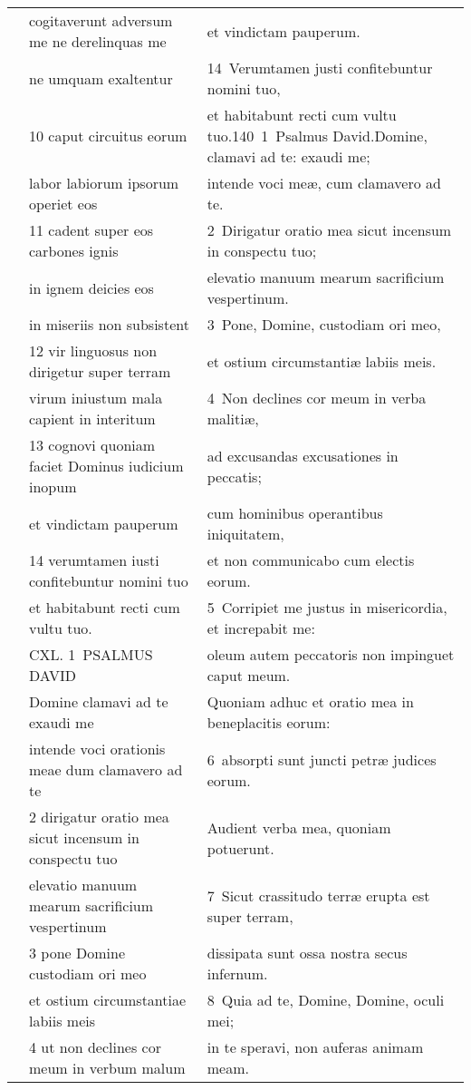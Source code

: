 \documentclass{article}
\begin{document}
\begin{longtable}{@{}p{}p{}p{}@{}}
	&	cogitaverunt adversum me ne derelinquas me	&	et vindictam pauperum.	\\
	&	ne umquam exaltentur	&	14 Verumtamen justi confitebuntur nomini tuo,	\\
	&	10 caput circuitus eorum	&	et habitabunt recti cum vultu tuo.140 1 Psalmus David.Domine, clamavi ad te: exaudi me;	\\
	&	labor labiorum ipsorum operiet eos	&	intende voci meæ, cum clamavero ad te.	\\
	&	11 cadent super eos carbones ignis	&	2 Dirigatur oratio mea sicut incensum in conspectu tuo;	\\
	&	in ignem deicies eos	&	elevatio manuum mearum sacrificium vespertinum.	\\
	&	in miseriis non subsistent	&	3 Pone, Domine, custodiam ori meo,	\\
	&	12 vir linguosus non dirigetur super terram	&	et ostium circumstantiæ labiis meis.	\\
	&	virum iniustum mala capient in interitum	&	4 Non declines cor meum in verba malitiæ,	\\
	&	13 cognovi quoniam faciet Dominus iudicium inopum	&	ad excusandas excusationes in peccatis;	\\
	&	et vindictam pauperum	&	cum hominibus operantibus iniquitatem,	\\
	&	14 verumtamen iusti confitebuntur nomini tuo	&	et non communicabo cum electis eorum.	\\
	&	et habitabunt recti cum vultu tuo.	&	5 Corripiet me justus in misericordia, et increpabit me:	\\
	&	CXL. 1 PSALMUS DAVID	&	oleum autem peccatoris non impinguet caput meum.	\\
	&	Domine clamavi ad te exaudi me	&	Quoniam adhuc et oratio mea in beneplacitis eorum:	\\
	&	intende voci orationis meae dum clamavero ad te	&	6 absorpti sunt juncti petræ judices eorum.	\\
	&	2 dirigatur oratio mea sicut incensum in conspectu tuo	&	Audient verba mea, quoniam potuerunt.	\\
	&	elevatio manuum mearum sacrificium vespertinum	&	7 Sicut crassitudo terræ erupta est super terram,	\\
	&	3 pone Domine custodiam ori meo	&	dissipata sunt ossa nostra secus infernum.	\\
	&	et ostium circumstantiae labiis meis	&	8 Quia ad te, Domine, Domine, oculi mei;	\\
	&	4 ut non declines cor meum in verbum malum	&	in te speravi, non auferas animam meam.	\\

\end{longtable}
\end{document}
